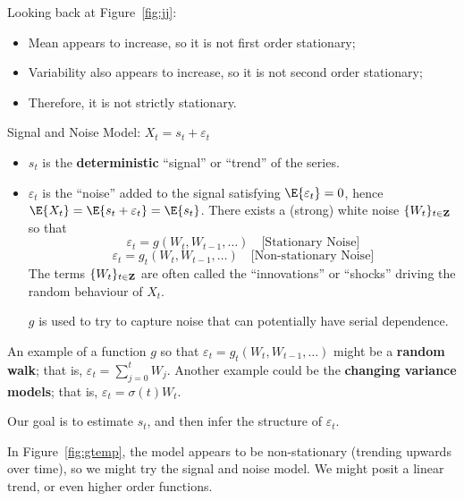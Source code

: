 Looking back at Figure~\ref{fig:jj}:
\begin{itemize}
    \item Mean appears to increase, so it is not first order stationary;
    \item Variability also appears to increase, so it is not
          second order stationary;
    \item Therefore, it is not strictly stationary.
\end{itemize}
Signal and Noise Model: $ X_t=s_t+\varepsilon_t $
\begin{itemize}
    \item $ s_t $ is the \textbf{deterministic}
          ``signal'' or ``trend'' of the series.
    \item $ \varepsilon_t $ is the ``noise'' added
          to the signal satisfying $ \E{\varepsilon_t}=0 $, hence
          $ \E{X_t}=\E{s_t+\varepsilon_t}=\E{s_t} $.
          There exists a (strong) white noise $ \{W_t\}_{t\in\mathbf{Z}} $
          so that
          \[ \varepsilon_t=g(W_t,W_{t-1},\ldots)\quad\text{[Stationary Noise]} \]
          \[ \varepsilon_t=g_t(W_t,W_{t-1},\ldots)\quad\text{[Non-stationary Noise]} \]
          The terms $ \{W_t\}_{t\in\mathbf{Z}} $ are often called the
          ``innovations'' or ``shocks'' driving the random behaviour
          of $ X_t $.

              {\color{blue}$ g $ is used to try to capture noise that can
                  potentially have serial dependence.}
\end{itemize}
\begin{Example}{}{}
    An example of a function $ g $ so that $ \varepsilon_t=g_t(W_t,W_{t-1},\ldots) $
    might be a \textbf{random walk}; that is, $ \varepsilon_t=\sum_{j=0}^{t} W_j $.
    Another example could be the \textbf{changing variance models}; that is,
    $ \varepsilon_t=\sigma(t)W_t $.
\end{Example}
Our goal is to estimate $ s_t $, and then infer the structure of $ \varepsilon_t $.

In Figure~\ref{fig:gtemp}, the model appears to be non-stationary
(trending upwards over time),
so we might try the signal and noise model. We might posit
a linear trend, or even higher order functions.

